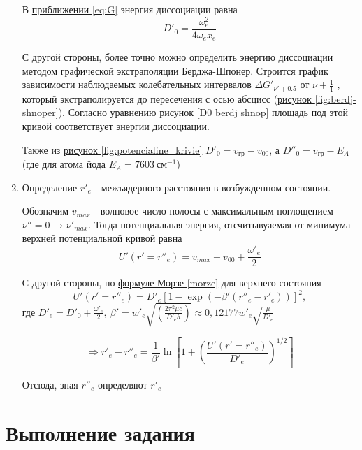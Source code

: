 \documentclass{article}
\begin{document}
\begin{enumerate}
В \hyperref[eq:G]{приближении \ref*{eq:G}} энергия диссоциации равна 
\begin{equation}
\label{eq:D0 lin}
    D'_0 = \frac{\omega^2_e}{4\omega_e x_e}
\end{equation}

С другой стороны, более точно можно определить энергию
диссоциации методом графической экстраполяции Берджа-Шпонер. Строится график зависимости наблюдаемых колебательных
интервалов $\Delta G'_{\nu'+0.5}$ от $\nu + \frac{1}{1}$ , который экстраполируется до пересечения с осью абсцисс (\hyperref[fig:berdj-shnoper]{рисунок \ref*{fig:berdj-shnoper}}). Согласно уравнению \hyperref[D0 berdj shnop]{рисунок \ref*{D0 berdj shnop}} площадь под этой кривой соответствует энергии диссоциации. 

Также из \hyperref[fig:potencialine_krivie]{рисунок \ref*{fig:potencialine_krivie}} $D'_0 = v_{гр} - v_{00}$, а $D''_0 = v_{гр} - E_A $ (где для атома йода $E_A = 7603 ~см^{-1}$) 



\item Определение $r'_e$ - межъядерного расстояния в возбужденном состоянии.

Обозначим $v_{max}$ - волновое число полосы с максимальным поглощением $\nu'' = 0$ → $\nu'_{max}$. Тогда потенциальная энергия, отсчитывуаемая от минимума верхней потенциальной кривой равна 
\begin{equation}
\label{U1}
    U'(r' = r''_e) = v_{max} - v_{00} + \frac{\omega'_e}{2}
\end{equation}

С другой стороны, по \hyperref[morze]{ формуле Морзе \ref*{morze}} для верхнего состояния 
\begin{equation}
\label{U2}
    U'(r' = r''_e) = D'_e\left[1- \exp(-\beta'(r''_e-r'_e))\right] ^2,
\end{equation}
где $D'_e = D'_0 + \frac{\omega'_e}{2}, ~\beta' = w'_e\sqrt{(\frac{2\pi ^2 \mu c}{D'_e h})}\approx 0,12177 w'_e \sqrt{\frac{\mu}{D'_e}}$

\begin{equation}
\label{r'e}
    \Rightarrow r'_e-r''_e = \frac{1}{\beta'}\ln\left[1+\left(\frac{U'(r' = r''_e)}{D'_e}\right)^{1/2}\right]
\end{equation}

Отсюда, зная $r''_e$ определяют $r'_e$ 
\end{enumerate}


\section{Выполнение задания} 
\end{document}
